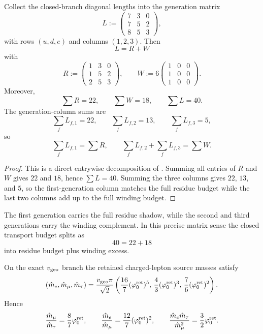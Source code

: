 
\begin{proposition}
\label{prop:transport-matrix-normal-form}
Collect the closed-branch diagonal lengths into the generation matrix
\[
L:=
\begin{pmatrix}
7&3&0\\
7&5&2\\
8&5&3
\end{pmatrix},
\]
with rows $(u,d,e)$ and columns $(1,2,3)$. Then
\[
L=R+W
\]
with
\[
R:=
\begin{pmatrix}
1&3&0\\
1&5&2\\
2&5&3
\end{pmatrix},
\qquad
W:=
6\begin{pmatrix}
1&0&0\\
1&0&0\\
1&0&0
\end{pmatrix}.
\]
Moreover,
\[
\sum R=22,
\qquad
\sum W=18,
\qquad
\sum L=40.
\]
The generation-column sums are
\[
\sum_f L_{f,1}=22,
\qquad
\sum_f L_{f,2}=13,
\qquad
\sum_f L_{f,3}=5,
\]
so
\[
\sum_f L_{f,1}=\sum R,
\qquad
\sum_f L_{f,2}+\sum_f L_{f,3}=\sum W.
\]
\end{proposition}

\begin{proof}
This is a direct entrywise decomposition of . Summing all entries of
$R$ and $W$ gives $22$ and $18$, hence $\sum L=40$. Summing the three columns gives
$22$, $13$, and $5$, so the first-generation column matches the full residue budget while the last
two columns add up to the full winding budget.
\end{proof}

\begin{remark}
The first generation carries the full residue shadow, while the second and third generations carry
the winding complement. In this precise matrix sense the closed transport budget splits as
\[
40=22+18
\]
into residue budget plus winding excess.
\end{remark}

\begin{theorem}
\label{thm:charged-lepton-compression}
On the exact $v_{\mathrm{geo}}$ branch the retained charged-lepton source masses satisfy
\[
(\hat m_e,\hat m_\mu,\hat m_\tau)
=
\frac{v_{\mathrm{geo}}\pi}{\sqrt2}
\left(
\frac{16}{7}(\varphi_0^{\mathrm{ret}})^5,\,
\frac{4}{3}(\varphi_0^{\mathrm{ret}})^3,\,
\frac{7}{6}(\varphi_0^{\mathrm{ret}})^2
\right).
\]
Hence
\[
\frac{\hat m_\mu}{\hat m_\tau}=\frac{8}{7}\varphi_0^{\mathrm{ret}},
\qquad
\frac{\hat m_e}{\hat m_\mu}=\frac{12}{7}(\varphi_0^{\mathrm{ret}})^2,
\qquad
\frac{\hat m_e \hat m_\tau}{\hat m_\mu^2}=\frac{3}{2}\varphi_0^{\mathrm{ret}}.
\]
\end{theorem}

